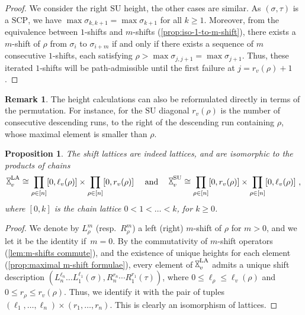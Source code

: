 \documentclass{amsart}
\newtheorem{proposition}[theorem]{Proposition}
\theoremstyle{definition}
\newtheorem{remark}[theorem]{Remark}
\newcommand{\resp}{resp.~} %
\newcommand{\SU}{\mathrm{SU}}
\newcommand{\LA}{\mathrm{LA}}
\newcommand{\SCP}{\mathrm{SCP}}
\newcommand{\hour}{\raisebox{0.065cm}{\rotatebox[origin=c]{90}{$\bowtie$}}_v}
\begin{document}
\begin{proof}
We consider the right $\SU$ height, the other cases are similar. 
As $(\sigma,\tau)$ is a $\SCP$, we have $\max \sigma_{k,k+1} = \max \sigma_{k+1}$ for all $k\geq 1$. 
Moreover, from the equivalence between $1$-shifts and $m$-shifts (\cref{prop:iso-1-to-m-shift}), there exists a $m$-shift of $\rho$ from $\sigma_i$ to $\sigma_{i+m}$ if and only if there exists a sequence of $m$ consecutive $1$-shifts, each satisfying $\rho > \max \sigma_{j,j+1}=\max \sigma_{j+1}$.
Thus, these iterated $1$-shifts will be path-admissible until the first failure at $j=r_v(\rho)+1$.
\end{proof}

\begin{remark}
The height calculations can also be reformulated directly in terms of the permutation.
For instance, for the $\SU$ diagonal $r_v(\rho)$ is the number of consecutive descending runs, to the right of the descending run containing $\rho$, whose maximal element is smaller than $\rho$.
\end{remark}

\begin{proposition} 
\label{prop:shift lattice}
The shift lattices are indeed lattices, and are isomorphic to the products of chains
\begin{align*}
\hour^\LA \cong \prod_{\rho \in [n]} [0,\ell_v(\rho)] \times \prod_{\rho \in [n]} [0,r_v(\rho)]
\quad \text{ and } \quad
\hour^\SU \cong \prod_{\rho \in [n]} [0,r_v(\rho)] \times \prod_{\rho \in [n]} [0,\ell_v(\rho)] \ ,
\end{align*}
where $[0,k]$ is the chain lattice $0<1<\dots<k$, for $k\geq 0$.
\end{proposition}

\begin{proof}
We denote by $L_\rho^m$ (\resp $R_\rho^m$) a left (right) $m$-shift of $\rho$ for $m>0$, and we let it be the identity if~$m=0$.
By the commutativity of $m$-shift operators (\cref{lem:m-shifts commute}), and the existence of unique heights for each element (\cref{prop:maximal m-shift formulae}), every element of $\hour^\LA$ admits a unique shift description $(L^{\ell_n}_{n} \dots L^{\ell_1}_{1}(\sigma),
R^{r_n}_{n}\cdots R^{r_{1}}_{1}(\tau))$, where $0\leq \ell_\rho\leq \ell_v(\rho)$ and $0\leq r_\rho\leq r_v(\rho)$.
Thus, we identify it with the pair of tuples $(\ell_1,\ldots,\ell_n)\times (r_1,\ldots,r_n)$.
This is clearly an isomorphism of lattices.
\end{proof}
\end{document}
